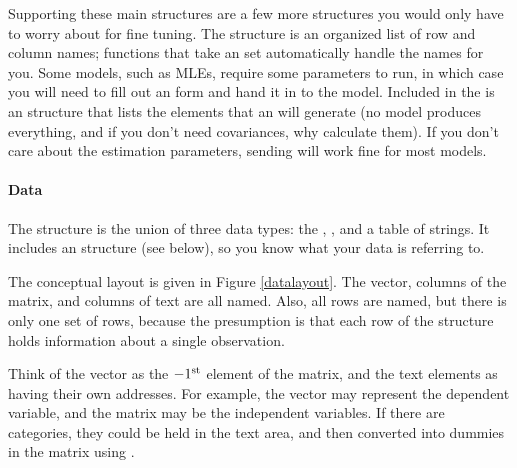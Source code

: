 Supporting these main structures are a few more structures you would only
have to worry about for fine tuning.  The  structure is
an organized list of row and column names; functions that take an 
 set automatically handle the names for you. 
Some models, such as MLEs, require some parameters to run, in
which case you will need to fill out an 
form and hand it in to the model. Included in the
 is an
 structure that lists the elements
that an  will generate (no model produces
everything, and if you don't need covariances, why calculate them). If you
don't care about the estimation parameters, sending  will
work fine for most models. 

\paragraph{Data} 
The  structure is the union of three data types:
the , , and a table of strings. It
includes an  structure (see below), so you know what
your data is referring to.

The conceptual layout is given in Figure \ref{datalayout}. The vector,
columns of the matrix, and columns of text are all named. Also, all rows
are named, but there is only one set of rows, because the presumption is
that each row of the structure holds information about a single
observation.

Think of the vector as the $-1^{\rm st}$ element of the matrix, and the 
text elements as having their own addresses. For example, the vector may
represent the dependent variable, and the matrix may be the independent
variables. If there are categories, they could be held in the text area,
and then converted into dummies in the matrix using
. 


